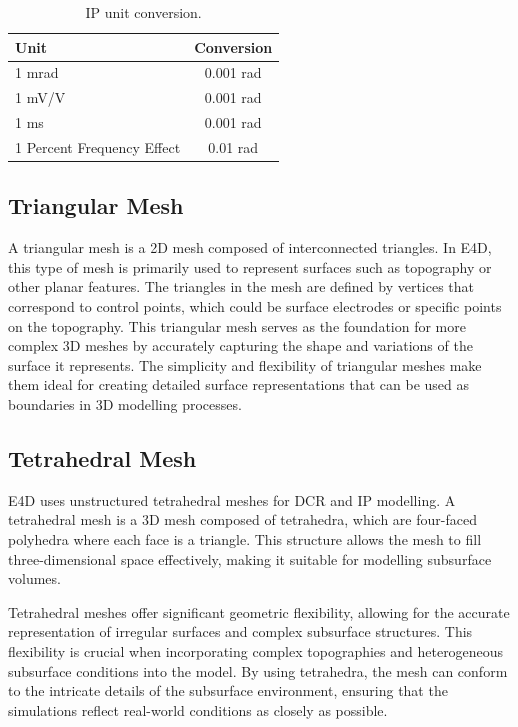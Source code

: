 \documentclass[a4paper,12pt]{article}
\begin{document}
\begin{table}[H]
\centering
\begin{tabular}{@{}lc@{}}
\toprule
Unit                       & Conversion \\ \midrule
1 mrad                     & 0.001 rad         \\
1 mV/V                     & 0.001 rad         \\
1 ms                       & 0.001 rad         \\
1 Percent Frequency Effect & 0.01 rad          \\ \bottomrule
\end{tabular}
\caption{IP unit conversion.}
\end{table}

\subsection{Triangular Mesh}

A triangular mesh is a 2D mesh composed of interconnected triangles. In E4D, this type of mesh is primarily used to represent surfaces such as topography or other planar features. The triangles in the mesh are defined by vertices that correspond to control points, which could be surface electrodes or specific points on the topography. This triangular mesh serves as the foundation for more complex 3D meshes by accurately capturing the shape and variations of the surface it represents. The simplicity and flexibility of triangular meshes make them ideal for creating detailed surface representations that can be used as boundaries in 3D modelling processes.

\subsection{Tetrahedral Mesh}

E4D uses unstructured tetrahedral meshes for DCR and IP modelling. A tetrahedral mesh is a 3D mesh composed of tetrahedra, which are four-faced polyhedra where each face is a triangle. This structure allows the mesh to fill three-dimensional space effectively, making it suitable for modelling subsurface volumes.

Tetrahedral meshes offer significant geometric flexibility, allowing for the accurate representation of irregular surfaces and complex subsurface structures. This flexibility is crucial when incorporating complex topographies and heterogeneous subsurface conditions into the model. By using tetrahedra, the mesh can conform to the intricate details of the subsurface environment, ensuring that the simulations reflect real-world conditions as closely as possible.
\end{document}

